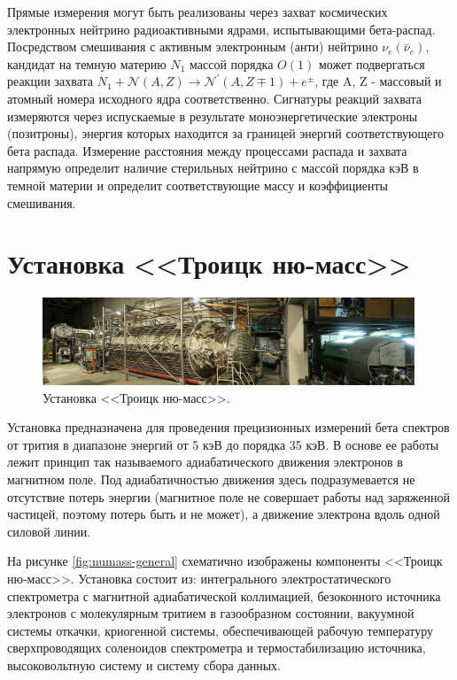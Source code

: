 \documentclass[a4paper,14pt]{extreport}
\begin{document}
Прямые измерения могут быть реализованы через захват космических электронных нейтрино радиоактивными ядрами, испытывающими бета-распад\cite{1005.3351}\cite{1009.5870}. Посредством смешивания с активным электронным (анти) нейтрино $\nu_e (\bar{\nu}_{e})$, кандидат на темную материю $ {N}^{}_{1} $ массой порядка $O(1)$ может подвергаться реакции захвата $ {N}^{}_{1} + \mathcal{N}(A,Z) \to \mathcal{N}^\prime (A, Z\mp1) + e^{\pm} $, где A, Z - массовый и атомный номера исходного ядра соответственно. Сигнатуры реакций захвата измеряются через испускаемые в результате моноэнергетические электроны (позитроны), энергия которых находится за границей энергий соответствующего бета распада. Измерение расстояния между процессами распада и захвата напрямую определит наличие стерильных нейтрино с массой порядка кэВ в темной материи и определит соответствующие массу и коэффициенты смешивания.

\chapter{Установка <<Троицк ню-масс>>}

\begin{figure}
  \centering
  \includegraphics[width = 0.99\textwidth]{img/nu_mass_setup/setup.jpg}
    \caption{Установка <<Троицк ню-масс>>.}
    \label{fig:numass-photo}
\end{figure}

Установка предназначена для проведения прецизионных измерений бета спектров от трития в диапазоне энергий от 5 кэВ до порядка 35 кэВ. В основе ее работы лежит 
принцип так называемого адиабатического движения электронов в магнитном поле. Под адиабатичностью движения здесь подразумевается не отсутствие потерь энергии (магнитное поле не совершает работы над заряженной частицей, поэтому потерь быть и не может), а движение электрона вдоль одной силовой линии.

На рисунке \ref{fig:numass-general} схематично изображены компоненты <<Троицк ню-масс>>. Установка состоит из: интегрального электростатического спектрометра с магнитной адиабатической коллимацией, безоконного источника электронов с молекулярным тритием в газообразном состоянии, вакуумной системы откачки, криогенной системы, обеспечивающей рабочую температуру сверхпроводящих соленоидов спектрометра и термостабилизацию источника, высоковольтную систему и систему сбора данных.
\end{document}
